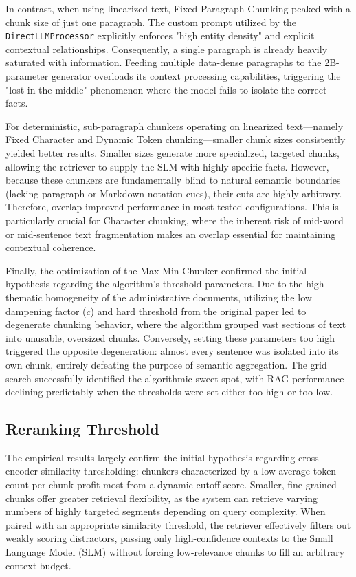 \documentclass[12pt]{article} %
\begin{document}
In contrast, when using linearized text, Fixed Paragraph Chunking peaked with a chunk size of just one paragraph. The custom prompt utilized by the \texttt{DirectLLMProcessor} explicitly enforces "high entity density" and explicit contextual relationships. Consequently, a single paragraph is already heavily saturated with information. Feeding multiple data-dense paragraphs to the 2B-parameter generator overloads its context processing capabilities, triggering the "lost-in-the-middle" phenomenon where the model fails to isolate the correct facts.

For deterministic, sub-paragraph chunkers operating on linearized text—namely Fixed Character and Dynamic Token chunking—smaller chunk sizes consistently yielded better results. Smaller sizes generate more specialized, targeted chunks, allowing the retriever to supply the SLM with highly specific facts. However, because these chunkers are fundamentally blind to natural semantic boundaries (lacking paragraph or Markdown notation cues), their cuts are highly arbitrary. Therefore, overlap improved performance in most tested configurations. This is particularly crucial for Character chunking, where the inherent risk of mid-word or mid-sentence text fragmentation makes an overlap essential for maintaining contextual coherence.

Finally, the optimization of the Max-Min Chunker confirmed the initial hypothesis regarding the algorithm's threshold parameters. Due to the high thematic homogeneity of the administrative documents, utilizing the low dampening factor ($c$) and hard threshold from the original paper led to degenerate chunking behavior, where the algorithm grouped vast sections of text into unusable, oversized chunks. Conversely, setting these parameters too high triggered the opposite degeneration: almost every sentence was isolated into its own chunk, entirely defeating the purpose of semantic aggregation. The grid search successfully identified the algorithmic sweet spot, with RAG performance declining predictably when the thresholds were set either too high or too low.

\subsection{Reranking Threshold}
The empirical results largely confirm the initial hypothesis regarding cross-encoder similarity thresholding: chunkers characterized by a low average token count per chunk profit most from a dynamic cutoff score. Smaller, fine-grained chunks offer greater retrieval flexibility, as the system can retrieve varying numbers of highly targeted segments depending on query complexity. When paired with an appropriate similarity threshold, the retriever effectively filters out weakly scoring distractors, passing only high-confidence contexts to the Small Language Model (SLM) without forcing low-relevance chunks to fill an arbitrary context budget.
\end{document}

